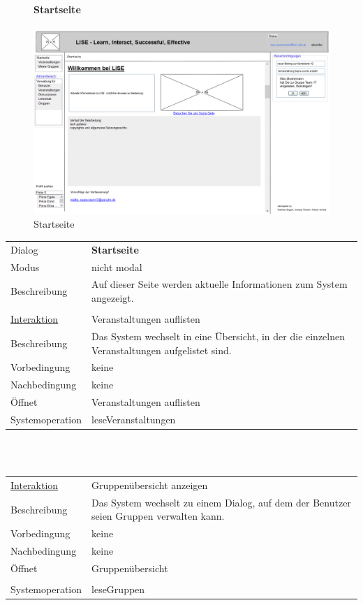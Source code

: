 \documentclass[12pt,a4paper]{article}
\begin{document}
{\begin{figure}[H]
	\paragraph{Startseite}
	\includegraphics[width=\textwidth]{Bilder/Mockups/GUI/Startseite.png}
	\caption{Startseite}
	\label{GuiStartseite}
\end{figure}

\begin{tabular}{l p{12cm}}
Dialog 	 & \textbf{Startseite} \\ 
Modus & nicht modal\\ 
Beschreibung   	 & Auf dieser Seite werden aktuelle Informationen zum System angezeigt.\\\\

\underline{Interaktion} 	 & Veranstaltungen auflisten\\ 
Beschreibung   	 & Das System wechselt in eine Übersicht, in der die einzelnen Veranstaltungen aufgelistet sind.\\
Vorbedingung	& keine \\
Nachbedingung	& keine \\
Öffnet			& \glqq Veranstaltungen auflisten\grqq \\
Systemoperation & leseVeranstaltungen\\
\end{tabular}\\\\

\begin{tabular}{l p{12cm}}
\underline{Interaktion} 	 & Gruppenübersicht anzeigen\\ 
Beschreibung   	 & Das System wechselt zu einem Dialog, auf dem der Benutzer seien Gruppen verwalten kann.\\
Vorbedingung	& keine \\
Nachbedingung	& keine \\
Öffnet			& \glqq Gruppenübersicht\grqq \\\\
Systemoperation & leseGruppen\\
\end{tabular}\\\\

}
\end{document}
